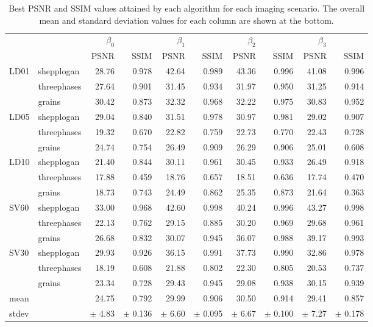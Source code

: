 \documentclass[]{interact}
\theoremstyle{plain}%
\theoremstyle{definition}
\theoremstyle{remark}
\begin{document}
\begin{table}
\caption{Best PSNR and SSIM values attained by each algorithm for each imaging scenario. The overall mean and standard deviation values for each column are shown at the bottom.}\label{T:PSNR}
\footnotesize
\begin{tabular}{ll|rr|rr|rr|rr}
		&&$\beta_0$		&&$\beta_1$		&&$\beta_2$		&&$\beta_3$	\\
		&&PSNR	&SSIM	&PSNR	&SSIM	&PSNR	&SSIM	&PSNR	&SSIM\\
  \hline
LD01	&shepplogan	&28.76	&0.978	&42.64	&0.989	&43.36	&0.996	&41.08	&0.996\\
	&threephases	&27.64	&0.901	&31.45	&0.934	&31.97	&0.950	&31.25	&0.914\\
	&grains	       &30.42	&0.873	&32.32	&0.968	&32.22	&0.975	&30.83	&0.952\\
LD05	&shepplogan	&29.04	&0.840	&31.51	&0.978	&30.97	&0.981	&29.02	&0.907\\
	&threephases	&19.32	&0.670	&22.82	&0.759	&22.73	&0.770	&22.43	&0.728\\
	&grains	       &24.74	&0.754	&26.49	&0.909	&26.29	&0.906	&25.01	&0.608\\
LD10	&shepplogan	&21.40	&0.844	&30.11	&0.961	&30.45	&0.933	&26.49	&0.918\\
	&threephases	&17.88	&0.459	&18.76	&0.657	&18.51	&0.636	&17.74	&0.470 \\
	&grains	       &18.73	&0.743	&24.49	&0.862	&25.35	&0.873	&21.64	&0.363\\
SV60	&shepplogan	&33.00	&0.968	&42.60	&0.998	&40.24	&0.996	&43.27	&0.998\\
	&threephases	&22.13	&0.762	&29.15	&0.885	&30.20	&0.969	&29.68	&0.961\\
	&grains	       &26.68	&0.832	&30.07	&0.945	&36.07	&0.988	&39.17	&0.993\\
SV30	&shepplogan	&29.93	&0.926	&36.15	&0.991	&37.73	&0.990	&32.86	&0.978\\
	&threephases	&18.19	&0.608	&21.88	&0.802	&22.30	&0.805	&20.53	&0.737\\
	&grains	       &23.34	&0.728	&29.43	&0.945	&29.08	&0.938	&30.15	&0.939\\
\hline									
mean                &&	24.75	&0.792            &29.99 	&0.906 &30.50 &0.914 &29.41 	&0.857  \\
stdev               &&$\pm$ 4.83 &$\pm$ 0.136	 &$\pm$ 6.60 &$\pm$ 0.095	 &$\pm$ 6.67	 &$\pm$ 0.100	&$\pm$ 7.27 &$\pm$ 0.178
\end{tabular}
\end{table}
\end{document}
